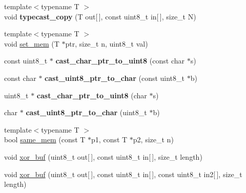 \begin{DoxyCompactItemize}
\mbox{\label{namespace_botan_aab110afb6189ae5c62da1169a0bd0cab}} 
{\footnotesize template$<$typename T $>$ }\\void {\bfseries typecast\+\_\+copy} (T out\mbox{[}$\,$\mbox{]}, const uint8\+\_\+t in\mbox{[}$\,$\mbox{]}, size\+\_\+t N)
\item 
{\footnotesize template$<$typename T $>$ }\\void \hyperlink{namespace_botan_ace49e77ed072090e3a7df831742981a6}{set\+\_\+mem} (T $\ast$ptr, size\+\_\+t n, uint8\+\_\+t val)
\item 
\mbox{\label{namespace_botan_a1deb698938556129dbf3e1d6ca7d1fb2}} 
const uint8\+\_\+t $\ast$ {\bfseries cast\+\_\+char\+\_\+ptr\+\_\+to\+\_\+uint8} (const char $\ast$s)
\item 
\mbox{\label{namespace_botan_a0494ff2de8a6d21cc45d6460c3ba6242}} 
const char $\ast$ {\bfseries cast\+\_\+uint8\+\_\+ptr\+\_\+to\+\_\+char} (const uint8\+\_\+t $\ast$b)
\item 
\mbox{\label{namespace_botan_ae81ace2e0e08f4fe29255708450c82de}} 
uint8\+\_\+t $\ast$ {\bfseries cast\+\_\+char\+\_\+ptr\+\_\+to\+\_\+uint8} (char $\ast$s)
\item 
\mbox{\label{namespace_botan_a1db9e3bf2de4699653f4308ec0ad6f11}} 
char $\ast$ {\bfseries cast\+\_\+uint8\+\_\+ptr\+\_\+to\+\_\+char} (uint8\+\_\+t $\ast$b)
\item 
{\footnotesize template$<$typename T $>$ }\\bool \hyperlink{namespace_botan_abaf9f9ec7cd1cb34fa0a9b98592fcb84}{same\+\_\+mem} (const T $\ast$p1, const T $\ast$p2, size\+\_\+t n)
\item 
void \hyperlink{namespace_botan_a9c8197d5fc973d59ae216ca5f865be55}{xor\+\_\+buf} (uint8\+\_\+t out\mbox{[}$\,$\mbox{]}, const uint8\+\_\+t in\mbox{[}$\,$\mbox{]}, size\+\_\+t length)
\item 
void \hyperlink{namespace_botan_a47f27789ca2bd6074362a06f2ee5bea4}{xor\+\_\+buf} (uint8\+\_\+t out\mbox{[}$\,$\mbox{]}, const uint8\+\_\+t in\mbox{[}$\,$\mbox{]}, const uint8\+\_\+t in2\mbox{[}$\,$\mbox{]}, size\+\_\+t length)
\item 
\mbox{\label{namespace_botan_ad250255def82fb51f03f1ffd85dcf494}} 

\end{DoxyCompactItemize}
